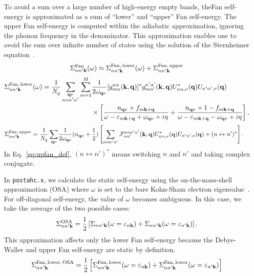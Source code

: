 \documentclass[12pt,a4paper]{article}
\newcommand{\mb}[1]{\mathbf{#1}}
\newcommand{\nk}[0]{{n\mathbf{k}}}
\newcommand{\npk}[0]{{n'\mathbf{k}}}
\newcommand{\mkq}[0]{{m\mathbf{k}+\mathbf{q}}}
\newcommand{\qnu}[0]{{\mathbf{q}\nu}}
\newcommand{\veps}[0]{\varepsilon}
\begin{document}
To avoid a sum over a large number of high-energy empty bands,
theFan self-energy is approximated as a sum of ``lower'' and ``upper''
Fan self-energy.
The upper Fan self-energy is computed within the adiabatic approximation,
ignoring the phonon frequency in the denominator.
This approximation enables one to avoid the sum over infinite number of states
using the solution of the Sternheimer equation~\cite{2011Gonze}.
\begin{equation} \label{eq:fantot_def}
    \Sigma^{\rm Fan}_{nn'\mb{k}}(\omega)
    \approx \Sigma^{\rm Fan,\,lower}_{nn'\mb{k}}(\omega)
    + \Sigma^{\rm Fan,\,upper}_{nn'\mb{k}}
\end{equation}
\begin{align} \label{eq:lofan_def}
    \Sigma^{\rm Fan,\,lower}_{nn'\mb{k}} (\omega)
    = \frac{1}{N_q}\sum_{\substack{\qnu \\ \kappa\alpha\kappa'\alpha'}}
    \sum_{m=1}^{M}
    &\frac{1}{2\omega_{\qnu}}
    [g_{mn}^{\kappa\alpha}(\mb{k},\mb{q})]^*
    g_{mn'}^{\kappa'\alpha'}(\mb{k},\mb{q})
    U^*_{\kappa\alpha,\nu}(\mb{q}) U_{\kappa'\alpha',\nu}(\mb{q}) \nonumber \\
    &\times \left[
    \frac{n_\qnu + f_\mkq}{\omega - \veps_\mkq + \omega_\qnu + i\eta}
    + \frac{n_\qnu + 1 - f_\mkq}{\omega - \veps_\mkq - \omega_\qnu + i\eta}
    \right],
\end{align}
\begin{align} \label{eq:upfan_def}
    \Sigma^{\rm Fan,\,upper}_{nn'\mb{k}}
    = \frac{1}{N_q}\sum_{\qnu}
    &\frac{1}{2\omega_{\qnu}} (n_\qnu + \frac{1}{2})
    \left[ \sum_{\kappa\alpha\kappa'\alpha'}
    \mathcal{F}_{nn'}^{\kappa\alpha\kappa'\alpha'}(\mb{k},\mb{q})
    U^*_{\kappa\alpha,\nu}(\mb{q}) U_{\kappa'\alpha',\nu}(\mb{q})
    + (n\leftrightarrow n')^*\right].
\end{align}
In Eq.~\eqref{eq:upfan_def}, $(n\leftrightarrow n')^*$ means switching $n$
and $n'$ and taking complex conjugate.

In \texttt{postahc.x}, we calculate the static self-energy using the
on-the-mass-shell approximation (OSA) where $\omega$ is set to
the bare Kohn-Sham electron eigenvalue~\cite{2018Nery}.
For off-diagonal self-energy, the value of $\omega$ becomes ambiguous.
In this case, we take the average of the two possible cases:
\begin{equation} \label{eq:sigma_osa}
    \Sigma_{nn'\mb{k}}^{\rm OSA}
    = \frac{1}{2} \left[\Sigma_{nn'\mb{k}}(\omega=\veps_\nk)
    + \Sigma_{nn'\mb{k}}(\omega=\veps_\npk) \right].
\end{equation}
This approximation affects only the lower Fan self-energy because the
Debye-Waller and upper Fan self-energy are static by definition.
\begin{equation} \label{eq:lofan_osa}
    \Sigma_{nn'\mb{k}}^{\rm Fan,\,lower,\,OSA}
    = \frac{1}{2} \left[ \Sigma_{nn'\mb{k}}^{\rm Fan,\,lower}(\omega=\veps_\nk)
    + \Sigma_{nn'\mb{k}}^{\rm Fan,\,lower}(\omega=\veps_\npk) \right]
\end{equation}
\end{document}
